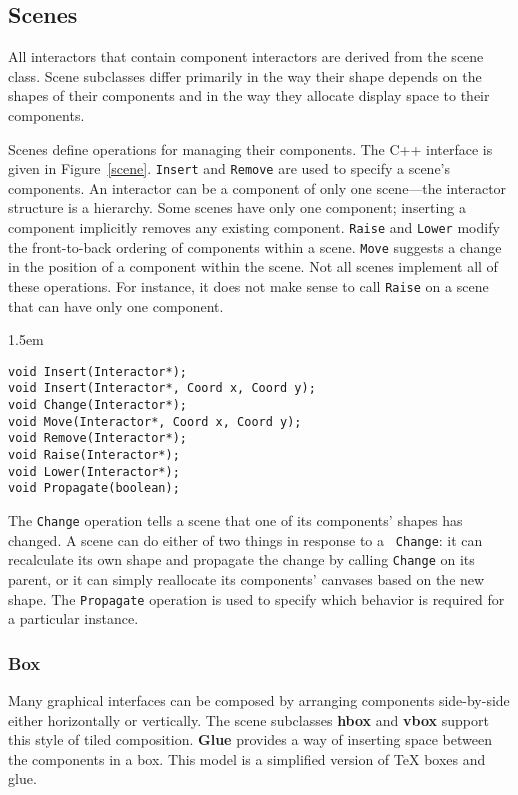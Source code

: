 \subsection{Scenes}
All interactors that contain component interactors
are derived from the scene class.
Scene subclasses differ primarily in the way their shape
depends on the shapes of
their components and in the way they allocate
display space to their components.

Scenes define operations for managing their components.  The C++ interface
is given in Figure~\ref{scene}.  {\tt Insert} and {\tt Remove} are used to
specify a scene's components.  An interactor can be a component of only one
scene---the interactor structure is a hierarchy.  Some scenes have only
one component; inserting a component implicitly removes any existing
component.  {\tt Raise} and {\tt Lower} modify the front-to-back ordering of
components within a scene.  {\tt Move} suggests a change in the position of
a component within the scene.  Not all scenes implement all of these
operations.  For instance, it does not make sense to call {\tt Raise} on a
scene that can have only one component.

\begin{figure*}
\begin{code}{1.5em}
\begin{verbatim}
void Insert(Interactor*);
void Insert(Interactor*, Coord x, Coord y);
void Change(Interactor*);
void Move(Interactor*, Coord x, Coord y);
void Remove(Interactor*);
void Raise(Interactor*);
void Lower(Interactor*);
void Propagate(boolean);
\end{verbatim}
\end{code}
\vspace{1ex}
\caption{Interface to Scene operations}
\label{scene}
\end{figure*}

The {\tt Change} operation tells a scene that one of its components' shapes
has changed.  A scene can do either of two things in response to a {\tt
Change}:  it can recalculate its own shape and propagate the change by
calling {\tt Change} on its parent, or it can simply reallocate its
components' canvases based on the new shape.  The {\tt Propagate} operation
is used to specify which behavior is required for a particular instance.

\subsubsection{Box}
Many graphical interfaces can be composed by arranging components side-by-side
either horizontally or vertically.  The scene subclasses {\bf hbox} and
{\bf vbox} support this style of tiled composition.  
{\bf Glue} provides a way of inserting space between the
components in a box.  This model is a simplified version of
\TeX\cite{tex} boxes and glue.

